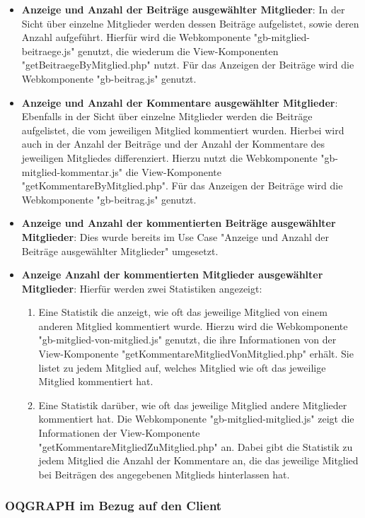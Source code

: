 \begin{itemize}
	\item \textbf{Anzeige und Anzahl der Beiträge ausgewählter Mitglieder}: In der Sicht über einzelne Mitglieder werden dessen Beiträge aufgelistet, sowie deren Anzahl aufgeführt. Hierfür wird die Webkomponente "gb-mitglied-beitraege.js" genutzt, die wiederum die View-Komponenten "getBeitraegeByMitglied.php" nutzt. Für das Anzeigen der Beiträge wird die Webkomponente "gb-beitrag.js" genutzt.
	\item \textbf{Anzeige und Anzahl der Kommentare ausgewählter Mitglieder}: Ebenfalls in der Sicht über einzelne Mitglieder werden die Beiträge aufgelistet, die vom jeweiligen Mitglied kommentiert wurden. Hierbei wird auch in der Anzahl der Beiträge und der Anzahl der Kommentare des jeweiligen Mitgliedes differenziert. Hierzu nutzt die Webkomponente "gb-mitglied-kommentar.js" die View-Komponente "getKommentareByMitglied.php". Für das Anzeigen der Beiträge wird die Webkomponente "gb-beitrag.js" genutzt.
	\item \textbf{Anzeige und Anzahl der kommentierten Beiträge ausgewählter Mitglieder}: Dies wurde bereits im Use Case "Anzeige und Anzahl der Beiträge ausgewählter Mitglieder" umgesetzt.
	\item \textbf{Anzeige Anzahl der kommentierten Mitglieder ausgewählter Mitglieder}: Hierfür werden zwei Statistiken angezeigt:
	\begin{enumerate}
		\item Eine Statistik die anzeigt, wie oft das jeweilige Mitglied von einem anderen Mitglied kommentiert wurde. Hierzu wird die Webkomponente "gb-mitglied-von-mitglied.js" genutzt, die ihre Informationen von der View-Komponente "getKommentareMitgliedVonMitglied.php" erhält. Sie listet zu jedem Mitglied auf, welches Mitglied wie oft das jeweilige Mitglied kommentiert hat.
		\item Eine Statistik darüber, wie oft das jeweilige Mitglied andere Mitglieder kommentiert hat. Die Webkomponente "gb-mitglied-mitglied.js" zeigt die Informationen der View-Komponente "getKommentareMitgliedZuMitglied.php" an. Dabei gibt die Statistik zu jedem Mitglied die Anzahl der Kommentare an, die das jeweilige Mitglied bei Beiträgen des angegebenen Mitglieds hinterlassen hat.
	\end{enumerate}
\end{itemize}

\subsubsection{OQGRAPH im Bezug auf den Client}\label{OQGRAPH-Client}

